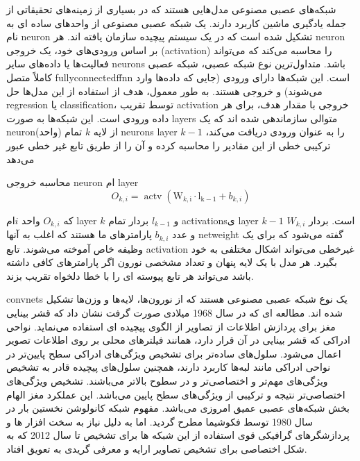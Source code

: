 شبکه‌های عصبی مصنوعی مدل‌هایی هستند که در بسیاری از زمینه‌های تحقیقاتی از جمله یادگیری ماشین کاربرد دارند. یک شبکه عصبی مصنوعی از واحدهای ساده ای به نام \gls{neuron} تشکیل شده است که در یک سیستم پیچیده سازمان یافته اند. هر \gls{neuron} بر اساس ورودی‌های خود، یک خروجی (\gls{activation}‌) را محاسبه می‌کند که می‌تواند فعالیت‌ها یا داده‌های سایر \glspl{neuron} باشد. متداول‌ترین نوع شبکه عصبی،  شبکه عصبی کاملاً متصل \gls{fullyconnectedffnn} است. این شبکه‌ها دارای ورودی (جایی که داده‌ها وارد می‌شوند) و خروجی‌ هستند. به طور معمول، هدف از استفاده از این مدل‌ها حل \gls{regression} یا \gls{classification}، توسط تقریب \gls{activation} خروجی با مقدار هدف، برای هر داده ورودی است. این شبکه‌ها به صورت \glspl{layer} متوالی سازماندهی شده اند که یک \gls{neuron}(واحد) از لایه $k$ تمام \glspl{neuron} \gls{layer} $k-1$ را به عنوان ورودی دریافت می‌کند، ترکیبی خطی از این مقادیر را محاسبه کرده و آن را از طریق تابع غیر خطی عبور می‌دهد

محاسبه خروجی
\gls{neuron} ام \gls{layer} 
\begin{equation}
	O_{k, i}=\operatorname{actv}\left(\mathrm{W}_{k, \mathrm{i}} \cdot \mathrm{l}_{\mathrm{k}-1}+b_{k, i}\right)
	\label{eq:ch_lr:activation_out}
\end{equation}

که $O_{k,i}$ واحد $i$ام \gls{layer} $k$  و $l_{k-1}$ بردار تمام \glspl{activation}ی \gls{layer} $k-1$ است. بردار $W_{k,i}$ و عدد $b_{k,i}$ پارامترهای ما هستند که اغلب به آنها \gls{netweight} گفته می‌شود که برای یک وظیفه خاص آموخته می‌شوند. تابع \gls{activation} غیرخطی  می‌تواند اشکال مختلفی  به خود بگیرد. هر مدل با یک لایه پنهان و تعداد مشخصی نورون اگر پارامترهای کافی داشته باشد می‌تواند هر تابع پیوسته ای را با خطا دلخواه تقریب بزند\cite{dhungel2017fully}.


\glspl{convnet}  یک نوع شبکه عصبی مصنوعی هستند که از نورون‌ها، لایه‌ها و وزن‌ها تشکیل شده اند. مطالعه ای که در سال 1968 میلادی صورت گرفت نشان داد که قشر بینایی مغز برای پردازش اطلاعات از تصاویر از الگوی پیچیده ای استفاده می‌نماید\cite{sutherland1968outlines}. نواحی ادراکی که قشر بینایی در آن قرار دارد، همانند فیلترهای محلی بر روی اطلاعات تصویر اعمال می‌شود. سلول‌های ساده‌تر برای تشخیص ویژگی‌های ادراکی سطح پایین‌تر در نواحی ادراکی مانند لبه‌ها کاربرد دارند، همچنین سلول‌های پیچیده قادر به تشخیص ویژگی‌های مهم‌تر و اختصاصی‌تر و در سطوح بالاتر می‌باشند. تشخیص ویژگی‌های اختصاصی‌تر نتیجه و ترکیبی از ویژگی‌های سطح پایین می‌باشد. این عملکرد مغز الهام بخش شبکه‌های عصبی عمیق امروزی می‌باشد. مفهوم شبکه کانولوشن نخستین بار در سال 1980 توسط فکوشیما مطرح گردید\cite{fukushima2007neocognitron}. اما به دلیل نیاز به سخت افزار ها و پردازشگر‌های گرافیکی قوی استفاده از این شبکه ها برای تشخیص تا سال 2012 که به شکل اختصاصی برای تشخیص تصاویر ارایه و معرفی گریدی به تعویق افتاد\cite{lecun2015deep}.

